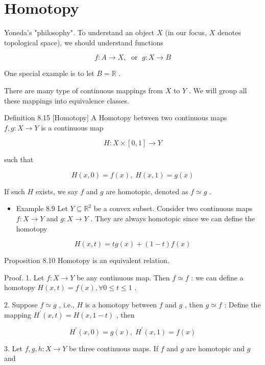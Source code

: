 \chapter{Homotopy}

Yoneda’s "philosophy". To understand an object \(X\) (in our focus, \(X\) denotes topological space), we should understand functions

\[
f : A \rightarrow  X,\;\text{ or }\;g : X \rightarrow  B
\]

One special example is to let \(B = \mathbb{R}\) .

There are many type of continuous mappings from \(X\) to \(Y\) . We will group all these mappings into equivalence classes.

Definition 8.15 [Homotopy] A Homotopy between two continuous maps \(f,g : X \rightarrow  Y\) is a continuous map

\[
H : X \times  \left\lbrack  {0,1}\right\rbrack   \rightarrow  Y
\]

such that

\[
H\left( {x,0}\right)  = f\left( x\right) ,\;H\left( {x,1}\right)  = g\left( x\right)
\]

If such \(H\) exists, we say \(f\) and \(g\) are homotopic, denoted as \(f \simeq  g\) .

\begin{itemize}
\item Example 8.9 Let \(Y \subseteq  {\mathbb{R}}^{2}\) be a convex subset. Consider two continuous maps \(f : X \rightarrow  Y\) and \(g : X \rightarrow  Y\) . They are always homotopic since we can define the homotopy
\end{itemize}

\[
H\left( {x,t}\right)  = {tg}\left( x\right)  + \left( {1 - t}\right) f\left( x\right)
\]

Proposition 8.10 Homotopy is an equivalent relation.

Proof. 1. Let \(f : X \rightarrow  Y\) be any continuous map. Then \(f \simeq  f\) : we can define a homotopy \(H\left( {x,t}\right)  = f\left( x\right) ,\forall 0 \leq  t \leq  1\) .

2. Suppose \(f \simeq  g\) , i.e., \(H\) is a homotopy between \(f\) and \(g\) , then \(g \simeq  f\) : Define the mapping \({H}^{\prime }\left( {x,t}\right)  = H\left( {x,1 - t}\right)\) , then

\[
{H}^{\prime }\left( {x,0}\right)  = g\left( x\right) ,\;{H}^{\prime }\left( {x,1}\right)  = f\left( x\right)
\]

3. Let \(f,g,h : X \rightarrow  Y\) be three continuous maps. If \(f\) and \(g\) are homotopic and \(g\) and


